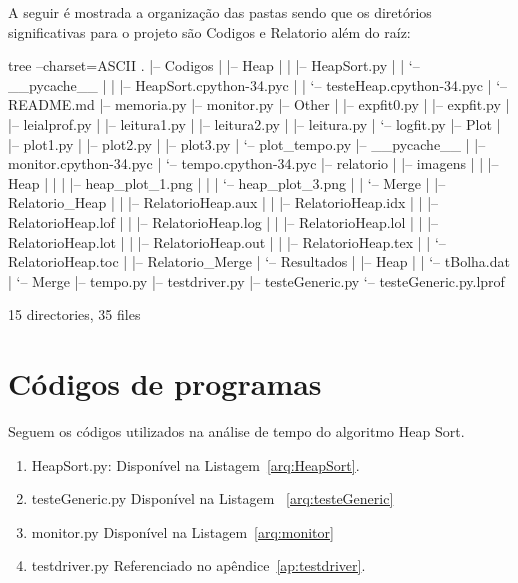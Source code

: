 \documentclass[12pt,a4paper,twoside]{report}
\begin{document}
A seguir é mostrada a organização das pastas sendo que os diretórios significativas para o projeto são Codigos e Relatorio além do raíz:
\begin{terminal}
tree --charset=ASCII
.
|-- Codigos
|   |-- Heap
|   |   |-- HeapSort.py
|   |   `-- __pycache__
|   |       |-- HeapSort.cpython-34.pyc
|   |       `-- testeHeap.cpython-34.pyc
|   `-- README.md
|-- memoria.py
|-- monitor.py
|-- Other
|   |-- expfit0.py
|   |-- expfit.py
|   |-- leialprof.py
|   |-- leitura1.py
|   |-- leitura2.py
|   |-- leitura.py
|   `-- logfit.py
|-- Plot
|   |-- plot1.py
|   |-- plot2.py
|   |-- plot3.py
|   `-- plot_tempo.py
|-- __pycache__
|   |-- monitor.cpython-34.pyc
|   `-- tempo.cpython-34.pyc
|-- relatorio
|   |-- imagens
|   |   |-- Heap
|   |   |   |-- heap_plot_1.png
|   |   |   `-- heap_plot_3.png
|   |   `-- Merge
|   |-- Relatorio_Heap
|   |   |-- RelatorioHeap.aux
|   |   |-- RelatorioHeap.idx
|   |   |-- RelatorioHeap.lof
|   |   |-- RelatorioHeap.log
|   |   |-- RelatorioHeap.lol
|   |   |-- RelatorioHeap.lot
|   |   |-- RelatorioHeap.out
|   |   |-- RelatorioHeap.tex
|   |   `-- RelatorioHeap.toc
|   |-- Relatorio_Merge
|   `-- Resultados
|       |-- Heap
|       |   `-- tBolha.dat
|       `-- Merge
|-- tempo.py
|-- testdriver.py
|-- testeGeneric.py
`-- testeGeneric.py.lprof

15 directories, 35 files

\end{terminal}

\section{Códigos de programas}
Seguem os códigos utilizados na análise de tempo do algoritmo Heap Sort.
\begin{enumerate}

\item HeapSort.py:
Disponível na Listagem~\ref{arq:HeapSort}.


\item testeGeneric.py
Disponível na Listagem ~\ref{arq:testeGeneric}


\item monitor.py
Disponível na Listagem~\ref{arq:monitor}



\item testdriver.py
 Referenciado no apêndice~\ref{ap:testdriver}.
\end{enumerate}
\end{document}
